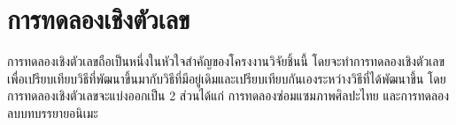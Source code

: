 \chapter{การทดลองเชิงตัวเลข}

\hspace{1cm} การทดลองเชิงตัวเลขถือเป็นหนึ่งในหัวใจสำคัญของโครงงานวิจัยชิ้นนี้ โดยจะทำการทดลองเชิงตัวเลขเพื่อเปรียบเทียบวิธีที่พัฒนาขึ้นมากับวิธีที่มีอยู่เดิมและเปรียบเทียบกันเองระหว่างวิธีที่ได้พัฒนาขึ้น โดยการทดลองเชิงตัวเลขจะแบ่งออกเป็น 2 ส่วนได้แก่ การทดลองซ่อมแซมภาพศิลปะไทย และการทดลองลบบทบรรยายอนิเมะ 



\clearpage